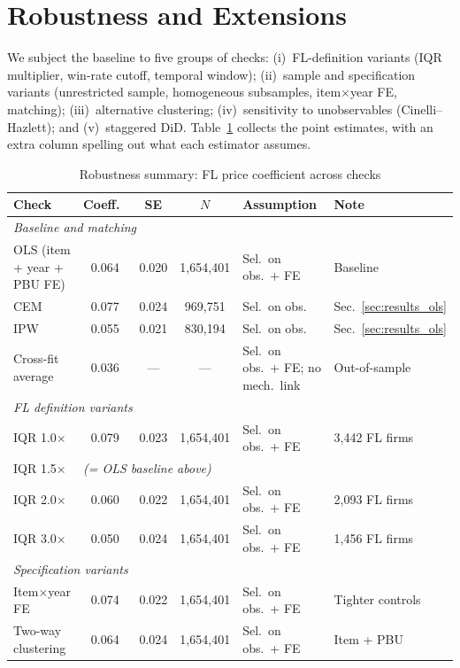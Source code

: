 
\section{Robustness and Extensions}
\label{sec:robustness}


We subject the baseline to five groups of checks:
(i)~FL-definition variants (IQR multiplier, win-rate cutoff, temporal
window); (ii)~sample and specification variants (unrestricted sample,
homogeneous subsamples, item$\times$year FE, matching);
(iii)~alternative clustering; (iv)~sensitivity to unobservables
(Cinelli--Hazlett); and (v)~staggered DiD.
Table~\ref{tab:robustness_summary} collects the point estimates, with
an extra column spelling out what each estimator assumes.


\begin{table}[htbp]
\centering
\caption{Robustness summary: FL price coefficient across checks}
\label{tab:robustness_summary}
\small
\begin{tabular}{lcccll}
\hline\hline
Check & Coeff.\ & SE & $N$ & Assumption & Note \\
\hline
\multicolumn{6}{l}{\textit{Baseline and matching}} \\
OLS (item + year + PBU FE) & 0.064 & 0.020 & 1{,}654{,}401 & Sel.\ on obs.\ + FE & Baseline \\
CEM & 0.077 & 0.024 & 969{,}751 & Sel.\ on obs. & Sec.~\ref{sec:results_ols} \\
IPW & 0.055 & 0.021 & 830{,}194 & Sel.\ on obs. & Sec.~\ref{sec:results_ols} \\
Cross-fit average & 0.036 & --- & --- & Sel.\ on obs.\ + FE; no mech.\ link & Out-of-sample \\
\hline
\multicolumn{6}{l}{\textit{FL definition variants}} \\
IQR 1.0$\times$ & 0.079 & 0.023 & 1{,}654{,}401 & Sel.\ on obs.\ + FE & 3{,}442 FL firms \\
IQR 1.5$\times$ & \multicolumn{5}{l}{\textit{(= OLS baseline above)}} \\
IQR 2.0$\times$ & 0.060 & 0.022 & 1{,}654{,}401 & Sel.\ on obs.\ + FE & 2{,}093 FL firms \\
IQR 3.0$\times$ & 0.050 & 0.024 & 1{,}654{,}401 & Sel.\ on obs.\ + FE & 1{,}456 FL firms \\
\hline
\multicolumn{6}{l}{\textit{Specification variants}} \\
Item$\times$year FE & 0.074 & 0.022 & 1{,}654{,}401 & Sel.\ on obs.\ + FE & Tighter controls \\
Two-way clustering & 0.064 & 0.024 & 1{,}654{,}401 & Sel.\ on obs.\ + FE & Item + PBU \\

\end{tabular}
\end{table}

